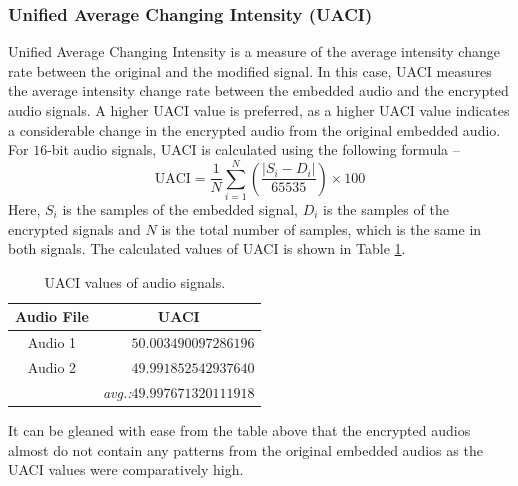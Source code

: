 \documentclass[a4paper]{cas-sc}
\begin{document}
\subsubsection{Unified Average Changing Intensity (UACI)}
Unified Average Changing Intensity is a measure of the average intensity change rate between the original and the modified signal. In this case, UACI measures the average intensity change rate between the embedded audio and the encrypted audio signals. A higher UACI value is preferred, as a higher UACI value indicates a considerable change in the encrypted audio from the original embedded audio. For $16$-bit audio signals, UACI is calculated using the following formula --
\begin{equation}
    \text{UACI}=\frac{1}{N}\sum_{i=1}^{N}\left(\frac{|S_i-D_i|}{65535}\right)\times100
\end{equation}
Here, $S_i$ is the samples of the embedded signal, $D_i$ is the samples of the encrypted signals and $N$ is the total number of samples, which is the same in both signals. The calculated values of UACI is shown in Table \ref{table:uaci}.
\begin{table}[pos=h]
    \begin{center}
        \caption{UACI values of audio signals.}
        \begin{tabular}{cr}
            \hline
            Audio File & \multicolumn{1}{c}{UACI}                    \\ \hline
            Audio 1    & $50.003490097286196$                        \\ \hdashline
            Audio 2    & $49.991852542937640$                        \\ \hline
                       & \textit{avg.:}$\mathbf{49.997671320111918}$
        \end{tabular}
        \label{table:uaci}
    \end{center}
\end{table}

It can be gleaned with ease from the table above that the encrypted audios almost do not contain any patterns from the original embedded audios as the UACI values were comparatively high.
\end{document}
